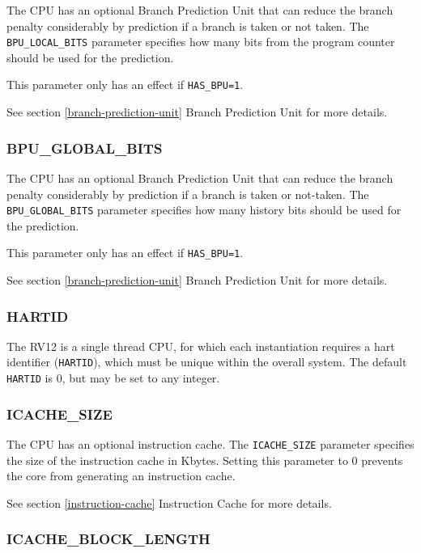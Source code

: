 The CPU has an optional Branch Prediction Unit that can reduce the
branch penalty considerably by prediction if a branch is taken or not
taken. The \texttt{BPU\_LOCAL\_BITS} parameter specifies how many bits from the
program counter should be used for the prediction.

This parameter only has an effect if \texttt{HAS\_BPU=1}.

\protect\hypertarget{_Toc326677733}{}{\protect\hypertarget{_Toc327108319}{}{}}See
section \ref{branch-prediction-unit} Branch Prediction Unit for more details.

\subsubsection{BPU\_GLOBAL\_BITS}\label{bpu_global_bits}

The CPU has an optional Branch Prediction Unit that can reduce the
branch penalty considerably by prediction if a branch is taken or
not-taken. The \texttt{BPU\_GLOBAL\_BITS} parameter specifies how many history
bits should be used for the prediction.

This parameter only has an effect if \texttt{HAS\_BPU=1}.

See section \ref{branch-prediction-unit} Branch Prediction Unit for more details.

\subsubsection{HARTID}\label{hartid}

The RV12 is a single thread CPU, for which each instantiation requires a
hart identifier (\texttt{HARTID}), which must be unique within the overall
system. The default \texttt{HARTID} is 0, but may be set to any integer.

\subsubsection{ICACHE\_SIZE}\label{icache_size}

The CPU has an optional instruction cache. The \texttt{ICACHE\_SIZE} parameter
specifies the size of the instruction cache in Kbytes. Setting this
parameter to 0 prevents the core from generating an instruction cache.

See section \ref{instruction-cache} Instruction Cache for more details.

\subsubsection{ICACHE\_BLOCK\_LENGTH}\label{icache_block_length}

